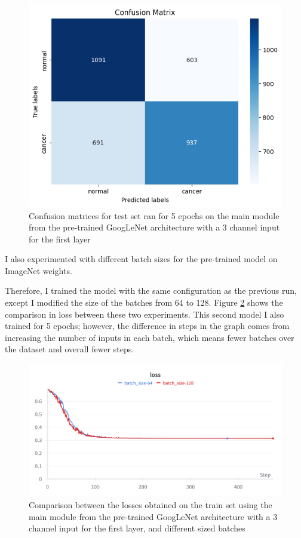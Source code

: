 \begin{figure}[!ht]
    \centering
    \includegraphics[width=0.5\linewidth]{figures/Figure21.png}
    \caption{Confusion matrices for test set ran for 5 epochs on the main module from the pre-trained GoogLeNet architecture with a 3 channel input for the first layer}
    \label{fig:fig20}
\end{figure}

I also experimented with different batch sizes for the pre-trained model on ImageNet weights.

Therefore, I trained the model with the same configuration as the previous run, except I modified the size of the batches from 64 to 128. Figure \ref{fig:fig21} shows the comparison in loss between these two experiments. This second model I also trained for 5 epochs; however, the difference in steps in the graph comes from increasing the number of inputs in each batch, which means fewer batches over the dataset and overall fewer steps.

\begin{figure}[H]
    \centering
    \includegraphics[width=0.75\linewidth]{figures/Figure22.png}
    \caption{Comparison between the losses obtained on the train set using the main module from the pre-trained GoogLeNet architecture with a 3 channel input for the first layer, and different sized batches}
    \label{fig:fig21}
\end{figure}

